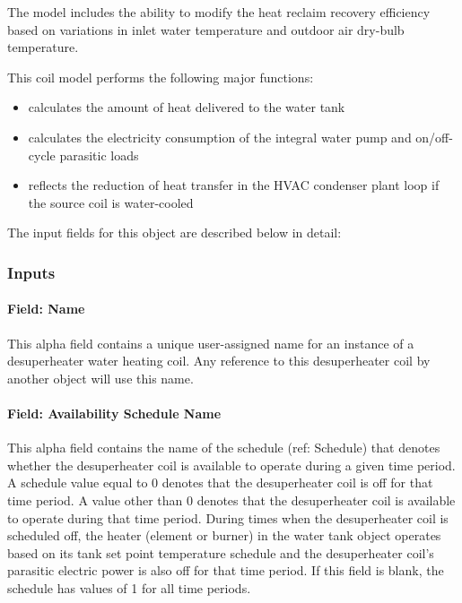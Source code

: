 The model includes the ability to modify the heat reclaim recovery efficiency based on variations in inlet water temperature and outdoor air dry-bulb temperature.

This coil model performs the following major functions:

\begin{itemize}
\item
  calculates the amount of heat delivered to the water tank
\item
  calculates the electricity consumption of the integral water pump and on/off-cycle parasitic loads
\item
  reflects the reduction of heat transfer in the HVAC condenser plant loop if the source coil is water-cooled
\end{itemize}

The input fields for this object are described below in detail:

\subsubsection{Inputs}\label{inputs-22-000}

\paragraph{Field: Name}\label{field-name-21-000}

This alpha field contains a unique user-assigned name for an instance of a desuperheater water heating coil. Any reference to this desuperheater coil by another object will use this name.

\paragraph{Field: Availability Schedule Name}\label{field-availability-schedule-name-12-000}

This alpha field contains the name of the schedule (ref: Schedule) that denotes whether the desuperheater coil is available to operate during a given time period. A schedule value equal to 0 denotes that the desuperheater coil is off for that time period. A value other than 0 denotes that the desuperheater coil is available to operate during that time period. During times when the desuperheater coil is scheduled off, the heater (element or burner) in the water tank object operates based on its tank set point temperature schedule and the desuperheater coil's parasitic electric power is also off for that time period. If this field is blank, the schedule has values of 1 for all time periods.

